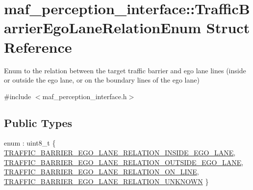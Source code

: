 \hypertarget{structmaf__perception__interface_1_1TrafficBarrierEgoLaneRelationEnum}{}\section{maf\+\_\+perception\+\_\+interface\+:\+:Traffic\+Barrier\+Ego\+Lane\+Relation\+Enum Struct Reference}
\label{structmaf__perception__interface_1_1TrafficBarrierEgoLaneRelationEnum}


Enum to the relation between the target traffic barrier and ego lane lines (inside or outside the ego lane, or on the boundary lines of the ego lane)  




{\ttfamily \#include $<$maf\+\_\+perception\+\_\+interface.\+h$>$}

\subsection*{Public Types}
\begin{DoxyCompactItemize}
\item 
enum \+: uint8\+\_\+t \{ \hyperlink{structmaf__perception__interface_1_1TrafficBarrierEgoLaneRelationEnum_ae602cdaece545355f4f217defcf9b05ea5b5cb53b147cd55e1aee36d933258ed2}{T\+R\+A\+F\+F\+I\+C\+\_\+\+B\+A\+R\+R\+I\+E\+R\+\_\+\+E\+G\+O\+\_\+\+L\+A\+N\+E\+\_\+\+R\+E\+L\+A\+T\+I\+O\+N\+\_\+\+I\+N\+S\+I\+D\+E\+\_\+\+E\+G\+O\+\_\+\+L\+A\+NE}, 
\hyperlink{structmaf__perception__interface_1_1TrafficBarrierEgoLaneRelationEnum_ae602cdaece545355f4f217defcf9b05ead34197b077b23347b7dcb69a7688a055}{T\+R\+A\+F\+F\+I\+C\+\_\+\+B\+A\+R\+R\+I\+E\+R\+\_\+\+E\+G\+O\+\_\+\+L\+A\+N\+E\+\_\+\+R\+E\+L\+A\+T\+I\+O\+N\+\_\+\+O\+U\+T\+S\+I\+D\+E\+\_\+\+E\+G\+O\+\_\+\+L\+A\+NE}, 
\hyperlink{structmaf__perception__interface_1_1TrafficBarrierEgoLaneRelationEnum_ae602cdaece545355f4f217defcf9b05eac3f16924031316a324f1650a2a020a3e}{T\+R\+A\+F\+F\+I\+C\+\_\+\+B\+A\+R\+R\+I\+E\+R\+\_\+\+E\+G\+O\+\_\+\+L\+A\+N\+E\+\_\+\+R\+E\+L\+A\+T\+I\+O\+N\+\_\+\+O\+N\+\_\+\+L\+I\+NE}, 
\hyperlink{structmaf__perception__interface_1_1TrafficBarrierEgoLaneRelationEnum_ae602cdaece545355f4f217defcf9b05ea00332657586d9b70f3bd04d0c6dd3e53}{T\+R\+A\+F\+F\+I\+C\+\_\+\+B\+A\+R\+R\+I\+E\+R\+\_\+\+E\+G\+O\+\_\+\+L\+A\+N\+E\+\_\+\+R\+E\+L\+A\+T\+I\+O\+N\+\_\+\+U\+N\+K\+N\+O\+WN}
 \}
\end{DoxyCompactItemize}
